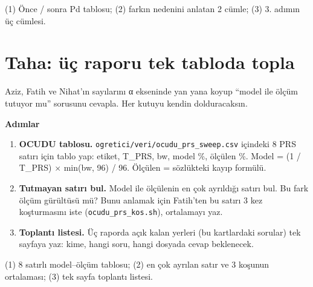 \documentclass[11pt,a4paper]{article}
\begin{document}
\begin{teslim}
(1) Önce / sonra Pd tablosu; (2) farkın nedenini anlatan 2 cümle; (3) 3. adımın üç cümlesi.
\end{teslim}

\clearpage
\section*{Taha: üç raporu tek tabloda topla}
\begin{amac}
Aziz, Fatih ve Nihat'ın sayılarını α ekseninde yan yana koyup ``model ile ölçüm tutuyor mu'' sorusunu cevapla. Her kutuyu kendin dolduracaksın.
\end{amac}

\textbf{Adımlar}
\begin{enumerate}[leftmargin=1.6em]
\item \textbf{OCUDU tablosu.} \texttt{ogretici/veri/ocudu\_prs\_sweep.csv} içindeki 8 PRS satırı için tablo yap: etiket, T\_PRS, bw, model \%, ölçülen \%. Model = (1 / T\_PRS) $\times$ min(bw, 96) / 96. Ölçülen = sözlükteki kayıp formülü.
\item \textbf{Tutmayan satırı bul.} Model ile ölçülenin en çok ayrıldığı satırı bul. Bu fark ölçüm gürültüsü mü? Bunu anlamak için Fatih'ten bu satırı 3 kez koşturmasını iste (\texttt{ocudu\_prs\_kos.sh}), ortalamayı yaz.
\item \textbf{Toplantı listesi.} Üç raporda açık kalan yerleri (bu kartlardaki sorular) tek sayfaya yaz: kime, hangi soru, hangi dosyada cevap beklenecek.
\end{enumerate}

\begin{teslim}
(1) 8 satırlı model--ölçüm tablosu; (2) en çok ayrılan satır ve 3 koşunun ortalaması; (3) tek sayfa toplantı listesi.
\end{teslim}
\end{document}

